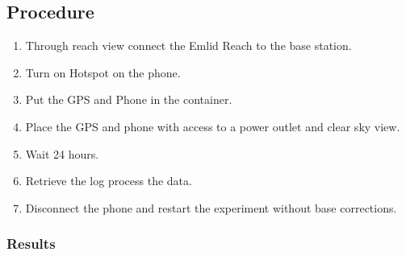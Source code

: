 \subsection*{Procedure}

\begin{enumerate}
	\item Through reach view connect the Emlid Reach to the base station.
	\item Turn on Hotspot on the phone.
	\item Put the GPS and Phone in the container.
	\item Place the GPS and phone with access to a power outlet and clear sky view.
	\item Wait 24 hours.
	\item Retrieve the log process the data.
	\item Disconnect the phone and restart the experiment without base corrections.
	
\end{enumerate}

\subsubsection*{Results}
